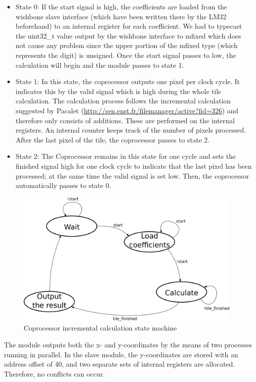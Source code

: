 \begin{itemize}
\item State 0: If the start signal is high, the coefficients are loaded from the wishbone slave interface (which have been written there by the LM32 beforehand) to an internal register for each coefficient. We had to typecast the uint32\_t value output by the wishbone interface to mfixed which does not cause any problem since the upper portion of the mfixed type (which represents the digit) is unsigned. Once the start signal passes to low, the calculation will begin and the module passes to state 1.
\item State 1: In this state, the coprocessor outputs one pixel per clock cycle. It indicates this by the valid signal which is high during the whole tile calculation. The calculation process follows the incremental calculation suggested by Pacalet (\url{http://sen.enst.fr/filemanager/active?fid=326}) and therefore only consists of additions. These are performed on the internal registers. An internal counter keeps track of the number of pixels processed. After the last pixel of the tile, the coprocessor passes to state 2.
\item State 2: The Coprocessor remains in this state for one cycle and sets the finished signal high for one clock cycle to indicate that the last pixel has been processed; at the same time the valid signal is set low. Then, the coprocessor automatically passes to state 0.

\end{itemize}
\begin{figure}[H]
\center
\includegraphics[width=11cm]{figs/coproc_incr_sm.pdf}
\caption{Coprocessor incremental calculation state machine}
\label{incr_sm}
\end{figure}

The module outputs both the x- and y-coordinates by the means of two processes running in parallel. In the slave module, the y-coordinates are stored with an address offset of 40, and two separate sets of internal registers are allocated. Therefore, no conflicts can occur.

